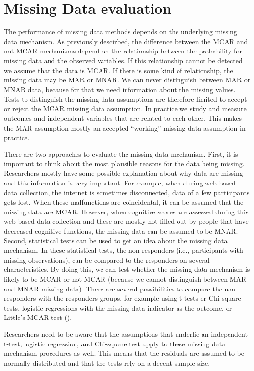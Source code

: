 \documentclass[]{book}
\begin{document}
\section{Missing Data evaluation}\label{missing-data-evaluation-1}

The performance of missing data methods depends on the underlying
missing data mechanism. As previously descirbed, the difference between
the MCAR and not-MCAR mechanisms depend on the relationship between the
probability for missing data and the observed variables. If this
relationship cannot be detected we assume that the data is MCAR. If
there is some kind of relationship, the missing data may be MAR or MNAR.
We can never distinguish between MAR or MNAR data, because for that we
need information about the missing values. Tests to distinguish the
missing data assumptions are therefore limited to accept or reject the
MCAR missing data assumption. In practice we study and measure outcomes
and independent variables that are related to each other. This makes the
MAR assumption mostly an accepted ``working'' missing data assumption in
practice.

There are two approaches to evaluate the missing data mechanism. First,
it is important to think about the most plausible reasons for the data
being missing. Researchers mostly have some possible explanation about
why data are missing and this information is very important. For
example, when during web based data collection, the internet is
sometimes disconnected, data of a few participants gets lost. When these
malfunctions are coincidental, it can be assumed that the missing data
are MCAR. However, when cognitive scores are assessed during this web
based data collection and these are mostly not filled out by people that
have decreased cognitive functions, the missing data can be assumed to
be MNAR. Second, statistical tests can be used to get an idea about the
missing data mechanism. In these statistical tests, the non-responders
(i.e., participants with missing observations), can be compared to the
responders on several characteristics. By doing this, we can test
whether the missing data mechanism is likely to be MCAR or not-MCAR
(because we cannot distinguish between MAR and MNAR missing data). There
are several possibilities to compare the non-responders with the
responders groups, for example using t-tests or Chi-square tests,
logistic regressions with the missing data indicator as the outcome, or
Little's MCAR test (\citet{Little1988}).

Researchers need to be aware that the assumptions that underlie an
independent t-test, logistic regression, and Chi-square test apply to
these missing data mechanism procedures as well. This means that the
residuals are assumed to be normally distributed and that the tests rely
on a decent sample size.
\end{document}
